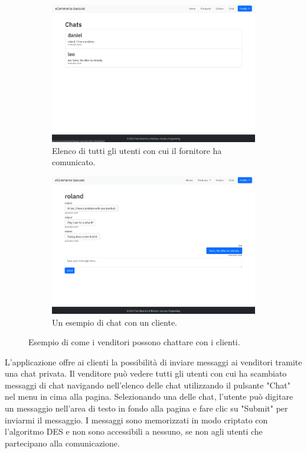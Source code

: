\documentclass[conference,onecolumn,a4paper]{IEEEtran}
\begin{document}
{\begin{figure}[H]
    \centering
    \begin{subfigure}[b]{0.4\linewidth}
        \includegraphics[width=\linewidth]{resources/chat-list.png}
        \caption{Elenco di tutti gli utenti con cui il fornitore ha comunicato.}
    \end{subfigure}
    \begin{subfigure}[b]{0.4\linewidth}
        \includegraphics[width=\linewidth]{resources/chat.png}
        \caption{Un esempio di chat con un cliente.}
    \end{subfigure}
    \caption{Esempio di come i venditori possono chattare con i clienti.}
\end{figure}

L'applicazione offre ai clienti la possibilità di inviare messaggi ai venditori tramite una chat privata. Il venditore può vedere tutti gli utenti con cui ha scambiato messaggi di chat navigando nell'elenco delle chat utilizzando il pulsante "Chat" nel menu in cima alla pagina. Selezionando una delle chat, l'utente può digitare un messaggio nell'area di testo in fondo alla pagina e fare clic su "Submit" per inviarmi il messaggio. I messaggi sono memorizzati in modo criptato con l'algoritmo DES e non sono accessibili a nessuno, se non agli utenti che partecipano alla comunicazione.


}
\end{document}
